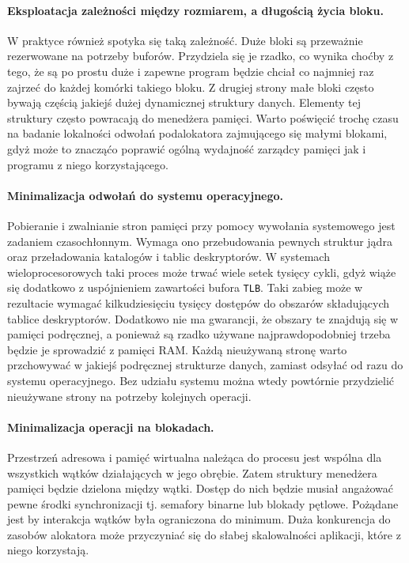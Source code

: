 \documentclass[12pt,a4paper,titlepage,twoside]{mwart}
\begin{document}
\paragraph{Eksploatacja zależności między rozmiarem, a długością życia bloku.}
W praktyce również spotyka się taką zależność. Duże bloki są przeważnie
rezerwowane na potrzeby buforów. Przydziela się je rzadko, co wynika choćby z
tego, że są po prostu duże i zapewne program będzie chciał co najmniej raz
zajrzeć do każdej komórki takiego bloku. Z drugiej strony małe bloki często
bywają częścią jakiejś dużej dynamicznej struktury danych. Elementy tej
struktury często powracają do menedżera pamięci. Warto poświęcić trochę czasu
na badanie lokalności odwołań podalokatora zajmującego się małymi blokami, gdyż
może to znacząćo poprawić ogólną wydajność zarządcy pamięci jak i programu z
niego korzystającego.

\paragraph{Minimalizacja odwołań do systemu operacyjnego.} Pobieranie i
zwalnianie stron pamięci przy pomocy wywołania systemowego jest zadaniem
czasochłonnym. Wymaga ono przebudowania pewnych struktur jądra oraz
przeładowania katalogów i tablic deskryptorów. W systemach wieloprocesorowych
taki proces może trwać wiele setek tysięcy cykli, gdyż wiąże się dodatkowo z
uspójnieniem zawartości bufora \texttt{TLB}. Taki zabieg może w rezultacie
wymagać kilkudziesięciu tysięcy dostępów do obszarów składujących tablice
deskryptorów. Dodatkowo nie ma gwarancji, że obszary te znajdują się w pamięci
podręcznej, a ponieważ są rzadko używane najprawdopodobniej trzeba będzie je
sprowadzić z pamięci RAM. Każdą nieużywaną stronę warto przchowywać w jakiejś
podręcznej strukturze danych, zamiast odsyłać od razu do systemu operacyjnego.
Bez udziału systemu można wtedy powtórnie przydzielić nieużywane strony na
potrzeby kolejnych operacji.

\paragraph{Minimalizacja operacji na blokadach.} Przestrzeń adresowa i pamięć
wirtualna należąca do procesu jest wspólna dla wszystkich wątków działających w
jego obrębie. Zatem struktury menedżera pamięci będzie dzielona między wątki.
Dostęp do nich będzie musiał angażować pewne środki synchronizacji tj. semafory
binarne lub blokady pętlowe. Pożądane jest by interakcja wątków była
ograniczona do minimum. Duża konkurencja do zasobów alokatora może przyczyniać
się do słabej skalowalności aplikacji, które z niego korzystają.
\end{document}
